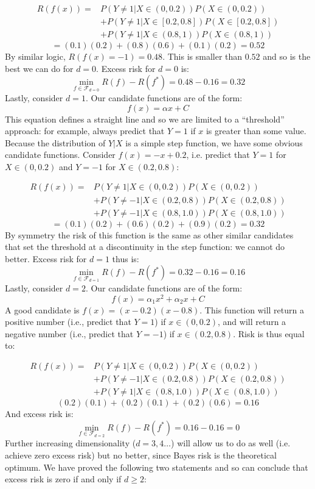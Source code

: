 \documentclass{article}
\begin{document}
\begin{equation*}
	\begin{split}
		R(f(x)) = & P(Y \neq 1 | X\in(0, 0.2))P(X\in(0, 0.2)) \\
		  & + P(Y \neq 1 | X\in[0.2, 0.8])P(X\in[0.2, 0.8]) \\ 
		  & + P(Y \neq 1 | X\in(0.8, 1))P(X\in(0.8, 1))
	\end{split}
\end{equation*}
$$
=(0.1)(0.2) + (0.8)(0.6) + (0.1)(0.2) = 0.52
$$
By similar logic, $R(f(x)=-1) = 0.48$. This is smaller than $0.52$ and so is the
best we can do for $d=0$. Excess risk for $d=0$ is:
$$
\min_{f \in \mathcal{F}_{d=0}} R(f) - R(f^*) = 0.48 - 0.16 = 0.32
$$
Lastly, consider $d=1$. Our candidate functions are of the form:
$$
f(x) = \alpha x + C
$$
This equation defines a straight line and so we are limited to a
``threshold'' approach: for example, always predict that $Y=1$ if $x$ is greater
than some value. Because the distribution of $Y|X$ is a simple step function, we
have some obvious candidate functions. Consider 
$f(x)=-x+0.2$, i.e. predict that $Y=1$ for
$X \in (0, 0.2)$ and $Y=-1$ for $X\in(0.2, 0.8)$:

\begin{equation*}
	\begin{split}
		R(f(x)) = & P(Y \neq 1  | X\in(0, 0.2))P(X\in(0, 0.2))  \\
		  & + P(Y \neq -1  | X\in(0.2, 0.8))P(X\in(0.2, 0.8))  \\ 
		  & + P(Y \neq -1 | X\in(0.8, 1.0))P(X\in(0.8,1.0)) 
	\end{split}
\end{equation*}
$$
= (0.1)(0.2) + (0.6)(0.2) + (0.9)(0.2) = 0.32
$$
By symmetry the risk of this function is the same as
other similar candidates that set the threshold at a discontinuity in the step
function: we cannot do better. Excess risk for $d=1$ thus is:
$$
\min_{f \in \mathcal{F}_{d=1}} R(f) - R(f^*) = 0.32 - 0.16 = 0.16
$$
Lastly, consider $d=2$. Our candidate functions are of the form:
$$
f(x) = \alpha_1 x^2 + \alpha_2 x + C
$$
A good candidate is $f(x)=(x-0.2)(x-0.8)$. This function will return a positive
number (i.e., predict that $Y=1$) if $x \in (0, 0.2)$, and will return a
negative number (i.e., predict that $Y=-1$) if $x \in (0.2, 0.8)$. Risk is thus
equal to:

\begin{equation*}
	\begin{split}
		R(f(x)) = & P(Y \neq 1  | X\in(0, 0.2))P(X\in(0, 0.2))  \\
		  & + P(Y \neq -1  | X\in(0.2, 0.8))P(X\in(0.2, 0.8))  \\ 
		  & + P(Y \neq 1 | X\in(0.8, 1.0))P(X\in(0.8,1.0)) 
	\end{split}
\end{equation*}
$$
(0.2)(0.1) + (0.2)(0.1) + (0.2)(0.6) = 0.16
$$
And excess risk is:
$$
\min_{f \in \mathcal{F}_{d=2}} R(f) - R(f^*) = 0.16 - 0.16 = 0
$$
Further increasing dimensionality ($d=3, 4\ldots$) will allow
us to do as well (i.e. achieve zero excess risk) but no better, since Bayes
risk is the theoretical optimum. We have proved the following two statements 
and so can conclude that excess risk is zero if and only if $d \geq 2$:
\end{document}
